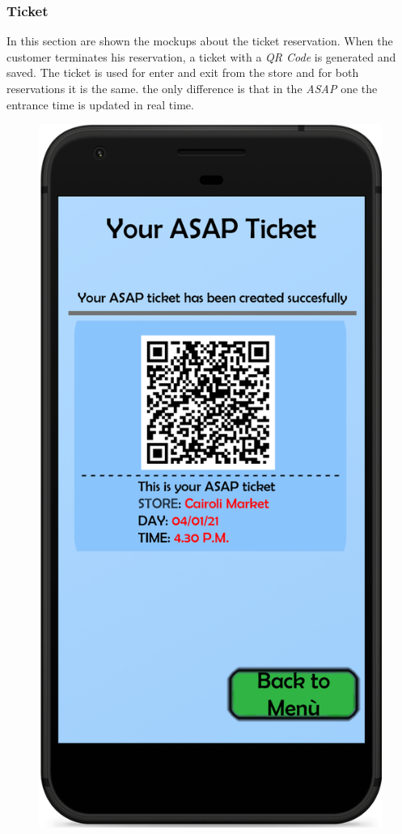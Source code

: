 \documentclass{article}
\begin{document}
		\newpage
		
		\subsubsection{Ticket}
		In this section are shown the mockups about the ticket reservation. When the customer terminates his reservation, a ticket with a \emph{QR Code} is generated and saved. The ticket is used for enter and exit from the store and for both reservations it is the same. the only difference is that in the \emph{ASAP} one the entrance time is updated in real time.
		\bigskip
		\bigskip
		\begin{figure}[!h]
			\centering
			\begin{minipage}[!h]{0.4\textwidth}
				\includegraphics[width=\textwidth]{../Mockups/ASAPTicket.png}

\end{minipage}
\end{figure}
\end{document}
